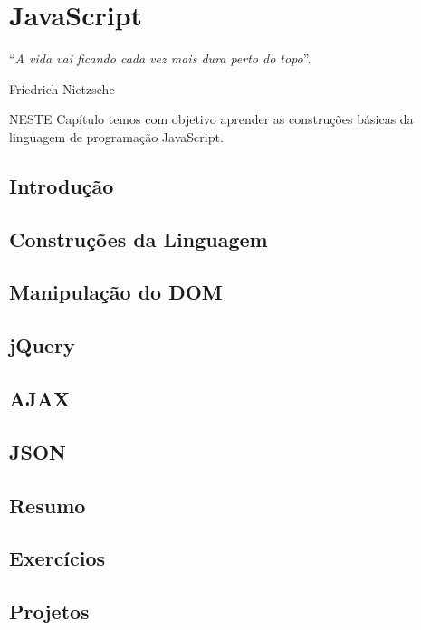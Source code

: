 \chapter{JavaScript}\label{cap:javaScript}
\epigraph{``\textit{A vida vai ficando cada vez mais dura perto do topo}''.}{Friedrich Nietzsche}

\lettrine[lines=4, lhang=0.1, lraise=0, loversize=0.2, findent=0.1em]{\textcolor{corAzulTema}{N}}{ESTE} Capítulo temos com objetivo aprender as construções básicas da linguagem de programação JavaScript.

\section{Introdução}

\section{Construções da Linguagem}

\section{Manipulação do DOM}

\section{jQuery}

\section{AJAX}

\section{JSON}

\section{Resumo}

\section{Exercícios}

\section{Projetos}
